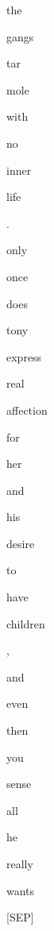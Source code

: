 \documentclass[varwidth=150mm]{standalone}
\begin{document}
\begin{CJK*}{UTF8}{gbsn}
{{{\colorbox{red!1.0815958976745605}{\strut the} \colorbox{red!1.999871015548706}{\strut gangs}\colorbox{red!1.7831909656524658}{\strut tar} \colorbox{red!6.566439151763916}{\strut mole} \colorbox{red!2.4915108680725098}{\strut with} \colorbox{red!2.225263833999634}{\strut no} \colorbox{red!1.7739694118499756}{\strut inner} \colorbox{red!1.0844494104385376}{\strut life} \colorbox{red!0.0}{\strut .} \colorbox{red!0.0}{\strut only} \colorbox{red!0.0}{\strut once} \colorbox{red!2.863107442855835}{\strut does} \colorbox{red!29.60272979736328}{\strut tony} \colorbox{red!0.0}{\strut express} \colorbox{red!1.3086363077163696}{\strut real} \colorbox{red!1.614776611328125}{\strut affection} \colorbox{red!5.234804630279541}{\strut for} \colorbox{red!13.317766189575195}{\strut her} \colorbox{red!0.0}{\strut and} \colorbox{red!0.0}{\strut his} \colorbox{red!1.0632684230804443}{\strut desire} \colorbox{red!0.0}{\strut to} \colorbox{red!1.9252732992172241}{\strut have} \colorbox{red!7.42932653427124}{\strut children} \colorbox{red!6.786368370056152}{\strut ,} \colorbox{red!3.569150447845459}{\strut and} \colorbox{red!1.5951977968215942}{\strut even} \colorbox{red!2.8542468547821045}{\strut then} \colorbox{red!9.441680908203125}{\strut you} \colorbox{red!0.0}{\strut sense} \colorbox{red!1.0506614446640015}{\strut all} \colorbox{red!1.2641606330871582}{\strut he} \colorbox{red!0.0}{\strut really} \colorbox{red!0.0}{\strut wants} \colorbox{red!12.881705284118652}{\strut [SEP]}
}}}
\end{CJK*}
\end{document}
